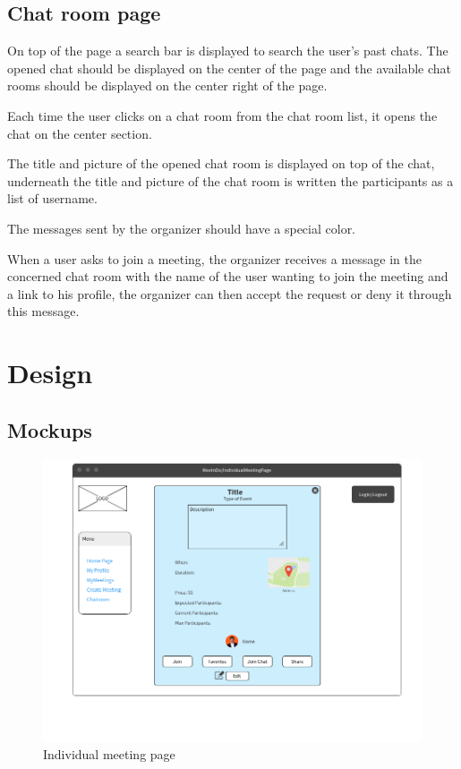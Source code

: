 \documentclass[conference]{IEEEtran}
\begin{document}
\subsection{Chat room page}

On top of the page a search bar is displayed to search the user's past chats.
The opened chat should be displayed on the center of the page and the available chat rooms should be displayed on the center right of the page.

Each time the user clicks on a chat room from the chat room list, it opens the chat on the center section. 

The title and picture of the opened chat room is displayed on top of the chat, underneath the title and picture of the chat room is written the participants as a list of username.

The messages sent by the organizer should have a special color.

When a user asks to join a meeting, the organizer receives a message in the concerned chat room with the name of the user wanting to join the meeting and a link to his profile, the organizer can then accept the request or deny it through this message.


\section{Design}

\subsection{Mockups}

\clearpage

\begin{figure}
  \centering
  \includegraphics[scale=0.3]{mockups/IndivMeeting}\quad
  \caption { Individual meeting page}
\end{figure}
\end{document}
